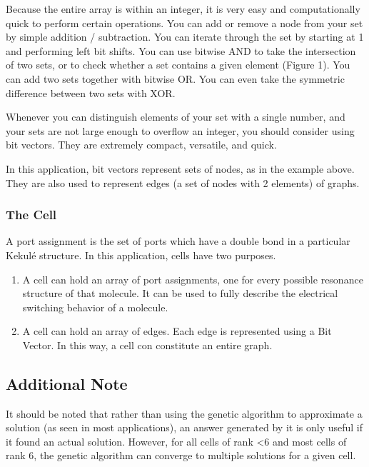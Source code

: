 \documentclass[12pt]{article}
\begin{document}
Because the entire array is within an integer, it is very easy and computationally quick to perform certain operations. You can add or remove a node from your set by simple addition / subtraction. You can iterate through the set by starting at 1 and performing left bit shifts. You can use bitwise AND to take the intersection of two sets, or to check whether a set contains a given element (Figure 1). You can add two sets together with bitwise OR. You can even take the symmetric difference between two sets with XOR.

Whenever you can distinguish elements of your set with a single number, and your sets are not large enough to overflow an integer, you should consider using bit vectors. They are extremely compact, versatile, and quick.

In this application, bit vectors represent sets of nodes, as in the example above. They are also used to represent edges (a set of nodes with 2 elements) of graphs. 

\subsubsection{The Cell}

A port assignment is the set of ports which have a double bond in a particular Kekul\'e structure. In this application, cells have two purposes. 

\begin{enumerate}
\item A cell can hold an array of port assignments, one for every possible resonance structure of that molecule. It can be used to fully describe the electrical switching behavior of a molecule.
\item A cell can hold an array of edges. Each edge is represented using a Bit Vector. In this way, a cell con constitute an entire graph.
\end{enumerate}


\subsection{Additional Note}

It should be noted that rather than using the genetic algorithm to approximate a solution (as seen in most applications), an answer generated by it is only useful if it found an actual solution. However, for all cells of rank \textless 6 and most cells of rank 6, the genetic algorithm can converge to multiple solutions for a given cell. 
\end{document}
